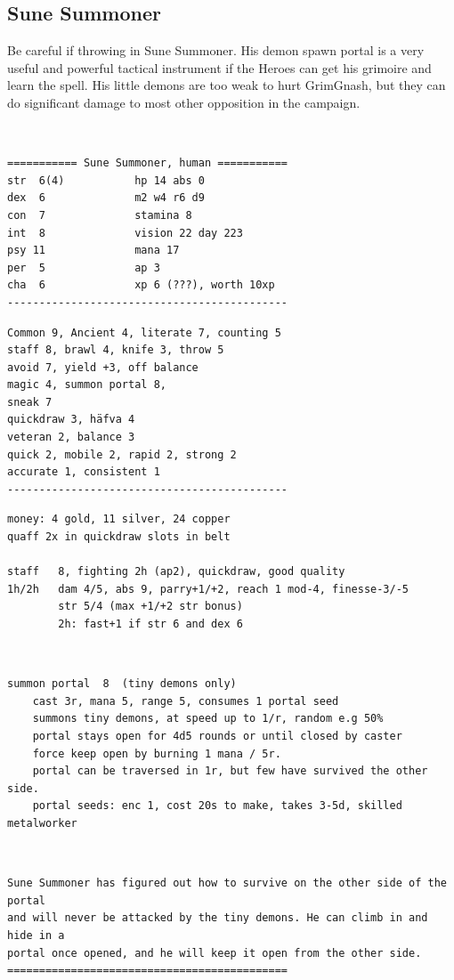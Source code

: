 \goodbreak 
\subsection*{Sune Summoner}
\label{sunesummoner}

Be careful if throwing in Sune Summoner. His demon spawn portal is a very useful and powerful tactical instrument if the Heroes can get his grimoire and learn the spell. His little demons are too weak to hurt GrimGnash, but they can do significant damage to most other opposition in the campaign.

\

\small \begin{samepage} \begin{verbatim}
=========== Sune Summoner, human ===========
str  6(4)           hp 14 abs 0
dex  6              m2 w4 r6 d9
con  7              stamina 8
int  8              vision 22 day 223
psy 11              mana 17
per  5              ap 3
cha  6              xp 6 (???), worth 10xp
--------------------------------------------
\end{verbatim} \goodbreak \begin{verbatim}
Common 9, Ancient 4, literate 7, counting 5
staff 8, brawl 4, knife 3, throw 5
avoid 7, yield +3, off balance
magic 4, summon portal 8, 
sneak 7
quickdraw 3, häfva 4
veteran 2, balance 3
quick 2, mobile 2, rapid 2, strong 2
accurate 1, consistent 1
--------------------------------------------
\end{verbatim} \goodbreak \begin{verbatim}
money: 4 gold, 11 silver, 24 copper
quaff 2x in quickdraw slots in belt

staff   8, fighting 2h (ap2), quickdraw, good quality
1h/2h   dam 4/5, abs 9, parry+1/+2, reach 1 mod-4, finesse-3/-5
        str 5/4 (max +1/+2 str bonus)
        2h: fast+1 if str 6 and dex 6
\end{verbatim} \end{samepage}   \   \goodbreak \begin{samepage} \begin{verbatim}
summon portal  8  (tiny demons only)
    cast 3r, mana 5, range 5, consumes 1 portal seed
    summons tiny demons, at speed up to 1/r, random e.g 50%
    portal stays open for 4d5 rounds or until closed by caster
    force keep open by burning 1 mana / 5r.
    portal can be traversed in 1r, but few have survived the other side.
    portal seeds: enc 1, cost 20s to make, takes 3-5d, skilled metalworker
\end{verbatim} \end{samepage}   \   \goodbreak \begin{samepage} \begin{verbatim}
Sune Summoner has figured out how to survive on the other side of the portal
and will never be attacked by the tiny demons. He can climb in and hide in a
portal once opened, and he will keep it open from the other side.
============================================
\end{verbatim} \end{samepage} \normalsize

